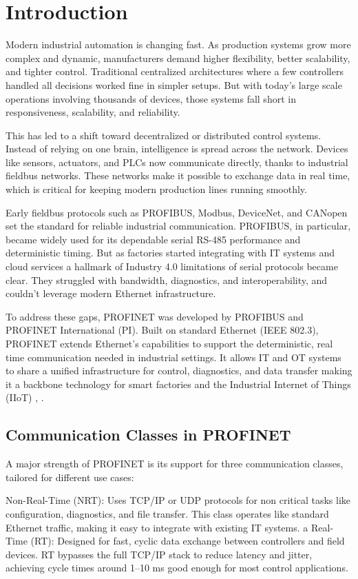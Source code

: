 \documentclass[conference]{IEEEtran}
\begin{document}
\section{Introduction}
Modern industrial automation is changing fast. As production systems grow more complex and dynamic, manufacturers demand higher flexibility, better scalability, and tighter control. Traditional centralized architectures where a few controllers handled all decisions worked fine in simpler setups. But with today’s large scale operations involving thousands of devices, those systems fall short in responsiveness, scalability, and reliability.

This has led to a shift toward decentralized or distributed control systems. Instead of relying on one brain, intelligence is spread across the network. Devices like sensors, actuators, and PLCs now communicate directly, thanks to industrial fieldbus networks. These networks make it possible to exchange data in real time, which is critical for keeping modern production lines running smoothly.

Early fieldbus protocols such as PROFIBUS, Modbus, DeviceNet, and CANopen set the standard for reliable industrial communication. PROFIBUS, in particular, became widely used for its dependable serial RS-485 performance and deterministic timing. But as factories started integrating with IT systems and cloud services a hallmark of Industry 4.0 limitations of serial protocols became clear. They struggled with bandwidth, diagnostics, and interoperability, and couldn’t leverage modern Ethernet infrastructure.

To address these gaps, PROFINET was developed by PROFIBUS and PROFINET International (PI). Built on standard Ethernet (IEEE 802.3), PROFINET extends Ethernet’s capabilities to support the deterministic, real time communication needed in industrial settings. It allows IT and OT systems to share a unified infrastructure for control, diagnostics, and data transfer making it a backbone technology for smart factories and the Industrial Internet of Things (IIoT) \cite{galloway2012industrial}, \cite{neumann2007communication}.

\subsection{Communication Classes in PROFINET} 
A major strength of PROFINET is its support for three communication classes, tailored for different use cases:

Non-Real-Time (NRT): Uses TCP/IP or UDP protocols for non critical tasks like configuration, diagnostics, and file transfer. This class operates like standard Ethernet traffic, making it easy to integrate with existing IT systems.
a
Real-Time (RT): Designed for fast, cyclic data exchange between controllers and field devices. RT bypasses the full TCP/IP stack to reduce latency and jitter, achieving cycle times around 1–10 ms good enough for most control applications.
\end{document}
